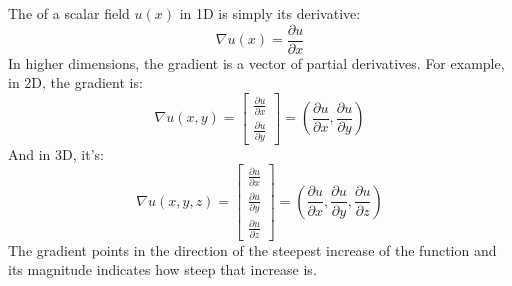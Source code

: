 \begin{remarkbox}[: Gradient]
    The  of a scalar field $u(x)$ in 1D is simply its derivative:
    \begin{equation*}
        \nabla u(x) = \frac{\partial u}{\partial x}
    \end{equation*}
    In higher dimensions, the gradient is a vector of partial derivatives. For example, in 2D, the gradient is:
    \begin{equation*}
        \nabla u(x, y) = \begin{bmatrix}
            \frac{\partial u}{\partial x} \\[.5em]
            \frac{\partial u}{\partial y}
        \end{bmatrix} = \left( \dfrac{\partial u}{\partial x}, \dfrac{\partial u}{\partial y} \right)
    \end{equation*}
    And in 3D, it's: 
    \begin{equation*}
        \nabla u(x,y,z) = \begin{bmatrix}
            \frac{\partial u}{\partial x} \\[.5em]
            \frac{\partial u}{\partial y} \\[.5em]
            \frac{\partial u}{\partial z}
        \end{bmatrix} = \left( \dfrac{\partial u}{\partial x}, \dfrac{\partial u}{\partial y}, \dfrac{\partial u}{\partial z} \right)
    \end{equation*}
    The gradient points in the direction of the steepest increase of the function and its magnitude indicates how steep that increase is.
\end{remarkbox}

